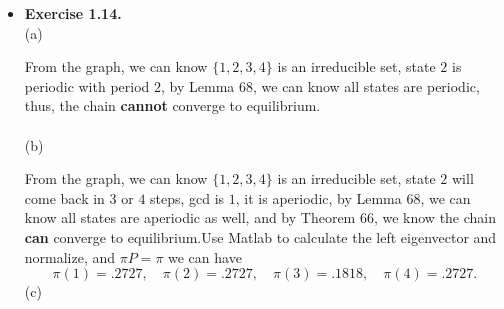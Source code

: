\documentclass[12pt]{article}
\theoremstyle{remark}
\theoremstyle{definition}
\numberwithin{figure}{section}
\begin{document}
\begin{itemize}
  \item 
\textbf{Exercise 1.14.}\\
(a) \begin{center}
\end{center}
From the graph, we can know $\big\{1,2,3,4\big\}$ is an irreducible set, state $2$ is periodic with period $2$, by Lemma 68, we can know all states are periodic, thus, the chain \textbf{cannot} converge to equilibrium.\\
\\
(b) \begin{center}
\end{center}
From the graph, we can know $\big\{1,2,3,4\big\}$ is an irreducible set, state $2$ will come back in $3$ or $4$ steps, gcd is $1$, it is aperiodic, by Lemma 68, we can know all states are aperiodic as well, and by Theorem 66, we know the chain \textbf{can} converge to equilibrium.Use Matlab to calculate the left eigenvector and normalize, and $\pi P=\pi $ we can have\\
\begin{equation*}
    \pi(1)= .2727,\quad \pi(2)= .2727,\quad \pi(3)= .1818, \quad \pi(4)= .2727.
\end{equation*}
(c) \begin{center}

\end{center}
\end{itemize}
\end{document}
